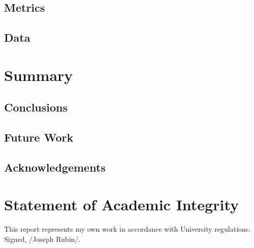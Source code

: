 \documentclass{article}
\begin{document}
\subsection{Metrics}
\subsection{Data}
\section{Summary}
\subsection{Conclusions}
\subsection{Future Work}
\subsection{Acknowledgements}
\section*{Statement of Academic Integrity}
This report represents my own work in accordance with University regulations.\\
Signed, /Joseph Rubin/.


\end{document}
